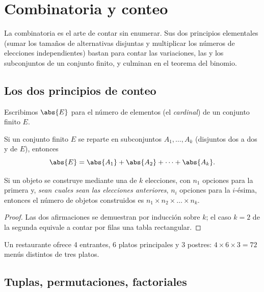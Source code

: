 \chapter{Combinatoria y conteo}\label{ch:g12:comb}

La combinatoria es el arte de contar sin enumerar. Sus dos principios
elementales (sumar los tamaños de alternativas disjuntas y multiplicar los
números de elecciones independientes) bastan para contar las variaciones,
las  y los subconjuntos de un conjunto finito, y culminan en el
teorema del binomio.

\section{Los dos principios de conteo}

Escribimos $\abs{E}$ para el número de elementos (el \emph{cardinal}) de un
conjunto finito $E$.

\begin{proposition}\label{prop:g12:comb:addition}
Si un conjunto finito $E$ se reparte en subconjuntos $A_1, \dots, A_k$
(disjuntos dos a dos y de  $E$), entonces
\[
\abs{E} = \abs{A_1} + \abs{A_2} + \dots + \abs{A_k}.
\]
\end{proposition}

\begin{proposition}\label{prop:g12:comb:multiplication}
Si un objeto se construye mediante una  de $k$ elecciones, con
$n_1$ opciones para la primera y, \emph{sean cuales sean las elecciones
anteriores}, $n_i$ opciones para la $i$-ésima, entonces el número de objetos
construidos es $n_1 \times n_2 \times \dots \times n_k$.
\end{proposition}

\begin{proof}
Las dos afirmaciones se demuestran por inducción sobre $k$; el caso
$k = 2$ de la segunda equivale a contar por filas una tabla rectangular.
\end{proof}

\begin{example}
Un restaurante ofrece 4 entrantes, 6 platos principales y 3 postres:
$4 \times 6 \times 3 = 72$ menús distintos de tres platos.
\end{example}

\section{Tuplas, permutaciones, factoriales}

